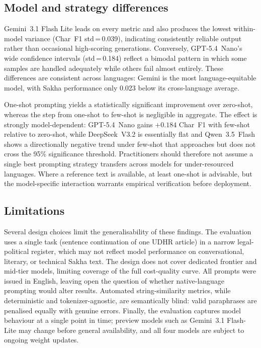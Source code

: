 \documentclass[11pt]{article}
\begin{document}
\subsection{Model and strategy differences}

Gemini~3.1 Flash Lite leads on every metric and also produces the lowest within-model variance (Char~F1 std\,=\,0.039), indicating consistently reliable output rather than occasional high-scoring generations.
Conversely, GPT-5.4~Nano's wide confidence intervals (std\,=\,0.184) reflect a bimodal pattern in which some samples are handled adequately while others fail almost entirely.
These differences are consistent across languages: Gemini is the most language-equitable model, with Sakha performance only 0.023 below its cross-language average.

One-shot prompting yields a statistically significant improvement over zero-shot, whereas the step from one-shot to few-shot is negligible in aggregate.
The effect is strongly model-dependent: GPT-5.4~Nano gains $+0.184$ Char~F1 with few-shot relative to zero-shot, while DeepSeek~V3.2 is essentially flat and Qwen~3.5~Flash shows a directionally negative trend under few-shot that approaches but does not cross the 95\% significance threshold.
Practitioners should therefore not assume a single best prompting strategy transfers across models for under-resourced languages.
Where a reference text is available, at least one-shot is advisable, but the model-specific interaction warrants empirical verification before deployment.

\subsection{Limitations}

Several design choices limit the generalisability of these findings.
The evaluation uses a single task (sentence continuation of one UDHR article) in a narrow legal-political register, which may not reflect model performance on conversational, literary, or technical Sakha text.
The design does not cover dedicated frontier and mid-tier models, limiting coverage of the full cost-quality curve.
All prompts were issued in English, leaving open the question of whether native-language prompting would alter results.
Automated string-similarity metrics, while deterministic and tokenizer-agnostic, are semantically blind: valid paraphrases are penalised equally with genuine errors.
Finally, the evaluation captures model behaviour at a single point in time; preview models such as Gemini~3.1 Flash-Lite may change before general availability, and all four models are subject to ongoing weight updates.
\end{document}
